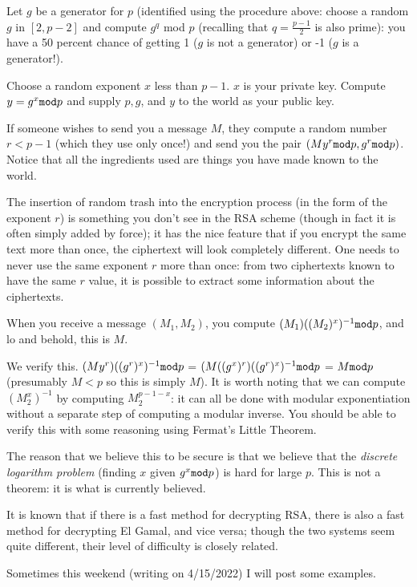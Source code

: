 \documentclass[12pt]{article}
\begin{document}
Let $g$ be a generator for $p$ (identified using the procedure above:  choose a random $g$ in $[2,p-2]$ and compute $g^q$ mod $p$ (recalling that $q=\frac{p-1}2$ is also prime):  you have a 50 percent chance of getting 1 ($g$ is not a generator) or -1 ($g$ is a generator!).

Choose a random exponent $x$ less than $p-1$.  $x$ is your private key.  Compute $y=g^x {\tt mod} p$ and supply $p, g$, and $y$ to the world as your public key.



If someone wishes to send you a message $M$, they compute a random number $r<p-1$ (which they use only once!) and send you the pair $(My^r {\tt mod} p,g^r{\tt mod}p)$.  Notice that all the ingredients used are things you have made known to the world.

The insertion of random trash into the encryption process (in the form of the exponent $r$) is something you don't see in the RSA scheme (though in fact it is often simply added by force);  it has the nice feature that if you encrypt the same text more than once, the ciphertext will look completely different.  One needs to never use the same exponent $r$ more than once:  from two ciphertexts known to have the same $r$ value, it is possible to extract some information about the ciphertexts.

When you receive a message $(M_1,M_2)$, you compute $(M_1)((M_2)^{x})^{-1}{\tt mod}p$, and lo and behold, this is $M$.

We verify this.  $(My^r)((g^r)^{x})^{-1}{\tt mod}p$ = $(M((g^x)^r)((g^r)^x)^{-1}{\tt mod}p$ = $M{\tt mod} p$ (presumably $M <p$ so this is simply $M$).  It is worth noting
that we can compute $(M_2^x)^{-1}$ by computing $M_2^{p-1-x}$:  it can all be done with modular exponentiation without a separate step of computing a modular inverse.  You should be able to verify this with some reasoning using Fermat's Little Theorem.

The reason that we believe this to be secure is that we believe that the {\em discrete logarithm problem\/} (finding $x$ given $g^x {\tt mod} p$) is hard for large $p$.  This is not a theorem:  it is what is currently believed.

It is known that if there is a fast method for decrypting RSA, there is also a fast method for decrypting El Gamal, and vice versa;  though the two systems seem quite different, their level of difficulty is closely related.

Sometimes this weekend (writing on 4/15/2022) I will post some examples.
\end{document}
